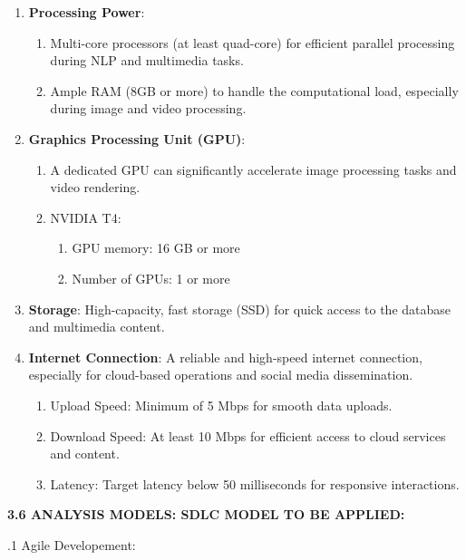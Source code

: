 \documentclass[12pt]{article}
\begin{document}
\begin{enumerate}
    \item 
        \textbf{Processing Power}: 
            \begin{enumerate}
                \item Multi-core processors (at least quad-core) for efficient parallel processing during NLP and multimedia tasks.
                \item Ample RAM (8GB or more) to handle the computational load, especially during image and video processing.
            \end{enumerate}
    \item 
        \textbf{Graphics Processing Unit (GPU)}:
            \begin{enumerate}
                \item A dedicated GPU can significantly accelerate image processing tasks and video rendering.
                \item NVIDIA T4: 
                \begin{enumerate}
                    \item GPU memory: 16 GB or more
                    \item Number of GPUs: 1 or more
                \end{enumerate}
            \end{enumerate}
    \item 
        \textbf{Storage}: High-capacity, fast storage (SSD) for quick access to the database and multimedia content.
    \item 
        \textbf{Internet Connection}: A reliable and high-speed internet connection, especially for cloud-based operations and social media dissemination.
            \begin{enumerate}
                \item Upload Speed: Minimum of 5 Mbps for smooth data uploads.
                \item Download Speed: At least 10 Mbps for efficient access to cloud services and content.
                \item Latency: Target latency below 50 milliseconds for responsive interactions.
            \end{enumerate}
\end{enumerate}
\bigskip
\justify \fontsize{12}{12}\textbf{3.6 ANALYSIS MODELS: SDLC MODEL TO BE
APPLIED:}

.1 Agile Developement:
\end{document}
